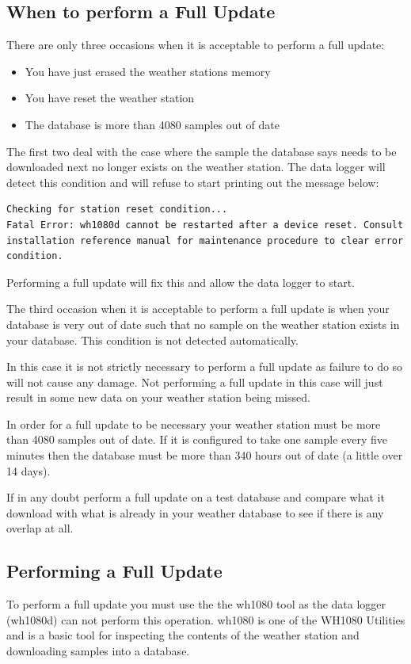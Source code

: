 \documentclass[a4paper,10pt,draft]{book}
\begin{document}
\subsection{When to perform a Full Update}
There are only three occasions when it is acceptable to perform a full update:
\begin{itemize}
\item You have just erased the weather stations memory
\item You have reset the weather station
\item The database is more than 4080 samples out of date
\end{itemize}

The first two deal with the case where the sample the database says needs to be downloaded next no longer exists on the weather station. The data logger will detect this condition and will refuse to start printing out the message below:
\begin{verbatim}
Checking for station reset condition...
Fatal Error: wh1080d cannot be restarted after a device reset. Consult 
installation reference manual for maintenance procedure to clear error
condition.
\end{verbatim}

Performing a full update will fix this and allow the data logger to start.

The third occasion when it is acceptable to perform a full update is when your database is very out of date such that no sample on the weather station exists in your database. This condition is not detected automatically.

In this case it is not strictly necessary to perform a full update as failure to do so will not cause any damage. Not performing a full update in this case will just result in some new data on your weather station being missed.

In order for a full update to be necessary your weather station must be more than 4080 samples out of date. If it is configured to take one sample every five minutes then the database must be more than 340 hours out of date (a little over 14 days).

If in any doubt perform a full update on a test database and compare what it download with what is already in your weather database to see if there is any overlap at all.

\subsection{Performing a Full Update}
To perform a full update you must use the the wh1080 tool as the data logger (wh1080d) can not perform this operation. wh1080 is one of the WH1080 Utilities and is a basic tool for inspecting the contents of the weather station and downloading samples into a database.
\end{document}
